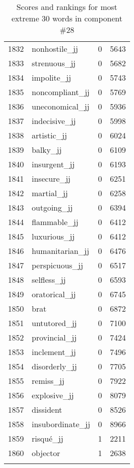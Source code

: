 \begin{longtable}[!htbp]{| rlr@{.}l |}
    1832 & nonhostile\_jj & 0 & 5643 \\
    1833 & strenuous\_jj & 0 & 5682 \\
    1834 & impolite\_jj & 0 & 5743 \\
    1835 & noncompliant\_jj & 0 & 5769 \\
    1836 & uneconomical\_jj & 0 & 5936 \\
    1837 & indecisive\_jj & 0 & 5998 \\
    1838 & artistic\_jj & 0 & 6024 \\
    1839 & balky\_jj & 0 & 6109 \\
    1840 & insurgent\_jj & 0 & 6193 \\
    1841 & insecure\_jj & 0 & 6251 \\
    1842 & martial\_jj & 0 & 6258 \\
    1843 & outgoing\_jj & 0 & 6394 \\
    1844 & flammable\_jj & 0 & 6412 \\
    1845 & luxurious\_jj & 0 & 6412 \\
    1846 & humanitarian\_jj & 0 & 6476 \\
    1847 & perspicuous\_jj & 0 & 6517 \\
    1848 & selfless\_jj & 0 & 6593 \\
    1849 & oratorical\_jj & 0 & 6745 \\
    1850 & brat & 0 & 6872 \\
    1851 & untutored\_jj & 0 & 7100 \\
    1852 & provincial\_jj & 0 & 7424 \\
    1853 & inclement\_jj & 0 & 7496 \\
    1854 & disorderly\_jj & 0 & 7705 \\
    1855 & remiss\_jj & 0 & 7922 \\
    1856 & explosive\_jj & 0 & 8079 \\
    1857 & dissident & 0 & 8526 \\
    1858 & insubordinate\_jj & 0 & 8966 \\
    1859 & risqué\_jj & 1 & 2211 \\
    1860 & objector & 1 & 2638 \\
    \hline
    \caption{Scores and rankings for most extreme 30 words in component \#28} \\
\end{longtable}
